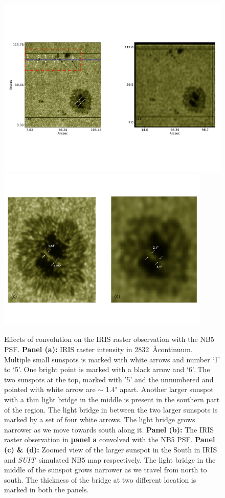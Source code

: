 \documentclass[a4paper,11pt]{article}
\newcommand{\suit}{{\it SUIT}}
\begin{document}
\begin{figure}[ht!]
    \centering
    \includegraphics[trim={0.3cm 4cm 0 2cm},clip,width=\textwidth]{SUIT_sunspot.pdf}\\
    \includegraphics[trim={0.3cm 3cm 0cm 3cm},clip,width=0.9\textwidth]{SUIT_sunspot_2.pdf}
    \caption{Effects of convolution on the IRIS raster observation with the NB5 PSF. \textbf{Panel (a):} IRIS raster intensity in 2832~\AA continuum.  Multiple small sunspots is marked with white arrows and number `1' to `5'. One bright point is marked with a black arrow and `6'. The two sunspots at the top, marked with '5' and the unnumbered and pointed with white arrow are $\sim$ 1.4" apart. Another larger sunspot with a thin light bridge in the middle is present in the southern part of the region. The light bridge in between the two larger sunspots is marked by a set of four white arrows. The light bridge grows narrower as we move towards south along it. \textbf{Panel (b):} The IRIS raster observation in \textbf{panel a} convolved with the NB5 PSF. \textbf{Panel (c) \& (d):} Zoomed view of the larger sunspot in the South in IRIS and \suit~simulated NB5 map respectively. The light bridge in the middle of the sunspot grows narrower as we travel from north to south. The thickness of the bridge at two different location is marked in both the panels.}
    \label{fig:nb5_conv_1}
\end{figure}
\end{document}
